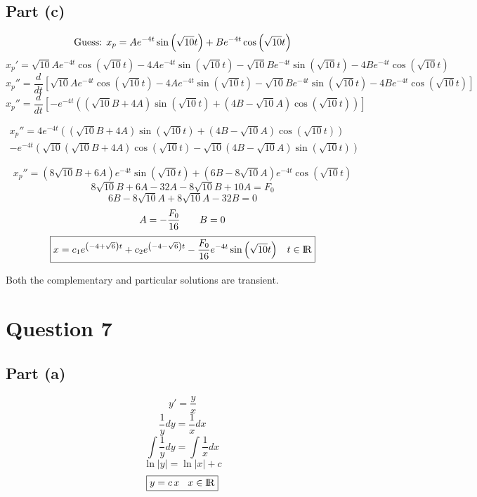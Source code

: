 \documentclass{article}
\begin{document}
\subsection*{Part (c)}
\[\textnormal{Guess: }x_p=Ae^{-4t}\sin\left(\sqrt{10}t\right)+Be^{-4t}\cos\left(\sqrt{10}t\right)\]
\[x_p'=\sqrt{10}Ae^{-4t}\cos\left(\sqrt{10}t\right)-4Ae^{-4t}\sin\left(\sqrt{10}t\right)-\sqrt{10}Be^{-4t}\sin\left(\sqrt{10}t\right)-4Be^{-4t}\cos\left(\sqrt{10}t\right)\]
\[x_p''=\frac{d}{dt}\left[\sqrt{10}Ae^{-4t}\cos\left(\sqrt{10}t\right)-4Ae^{-4t}\sin\left(\sqrt{10}t\right)-\sqrt{10}Be^{-4t}\sin\left(\sqrt{10}t\right)-4Be^{-4t}\cos\left(\sqrt{10}t\right)\right]\]
\[x_p''=\frac{d}{dt}\left[-e^{-4t}\left(\left(\sqrt{10}B+4A\right)\sin\left(\sqrt{10}t\right)+\left(4B-\sqrt{10}A\right)\cos\left(\sqrt{10}t\right)\right)\right]\]
\begin{center}
\begin{multline*}
x_p''=4e^{-4t}\left(\left(\sqrt{10}B+4A\right)\sin\left(\sqrt{10}t\right)+\left(4B-\sqrt{10}A\right)\cos\left(\sqrt{10}t\right)\right)\\
-e^{-4t}\left(\sqrt{10}\left(\sqrt{10}B+4A\right)\cos\left(\sqrt{10}t\right)-\sqrt{10}\left(4B-\sqrt{10}A\right)\sin\left(\sqrt{10}t\right)\right)
\end{multline*}
\end{center}
\[x_p''=\left(8\sqrt{10}B+6A\right)e^{-4t}\sin\left(\sqrt{10}t\right)+\left(6B-8\sqrt{10}A\right)e^{-4t}\cos\left(\sqrt{10}t\right)\]
\[8\sqrt{10}B+6A-32A-8\sqrt{10}B+10A=F_0\]
\[6B-8\sqrt{10}A+8\sqrt{10}A-32B=0\]
\[A=-\frac{F_0}{16}\hspace{7 mm}B=0\]
\[\boxed{x=c_1e^{\left(-4+\sqrt{6}\right)t}+c_2e^{\left(-4-\sqrt{6}\right)t}-\frac{F_0}{16}e^{-4t}\sin\left(\sqrt{10}t\right)\hspace{3 mm}t\in{\rm I\!R}}\]
\begin{center}
Both the complementary and particular solutions are transient.
\end{center}
\section*{Question 7}
\subsection*{Part (a)}
\[y'=\frac{y}{x}\]
\[\frac{1}{y}dy=\frac{1}{x}dx\]
\[\int\frac{1}{y}dy=\int\frac{1}{x}dx\]
\[\ln|y|=\ln|x|+c\]
\[\boxed{y=c\,x\hspace{3 mm}x\in{\rm I\!R}}\]
\end{document}
